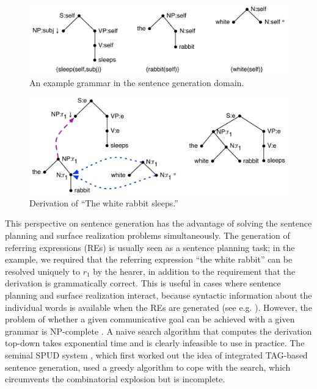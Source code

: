 \begin{figure}
  \centering
  \includegraphics[width=0.75\columnwidth]{pic-grammar}
  \caption{An example grammar in the sentence generation domain.}
  \label{fig:white-rabbit-sleeps-grammar}
\end{figure}

\begin{figure}
  \centering
  \includegraphics[width=0.75\columnwidth]{pic-derivation}
  \caption{Derivation of ``The white rabbit sleeps.''}
  \label{fig:white-rabbit-sleeps-deriv}
\end{figure}

This perspective on sentence generation has the advantage of solving
the sentence planning and surface realization problems
simultaneously. The generation of referring expressions (REs) is
usually seen as a sentence planning task; in the example, we required
that the referring expression ``the white rabbit'' can be resolved
uniquely to $r_1$ by the hearer, in addition to the requirement that
the derivation is grammatically correct. This is useful in cases where
sentence planning and surface realization interact, because syntactic
information about the individual words is available when the REs are
generated (see e.g. \citealt{stone98textual}). However, the problem of
whether a given communicative goal can be achieved with a given
grammar is NP-complete \citep{KolStr02}. A naive search algorithm that
computes the derivation top-down takes exponential time and is clearly
infeasible to use in practice. The seminal SPUD system
\citep{Stone2003a}, which first worked out the idea of integrated
TAG-based sentence generation, used a greedy algorithm to cope with
the search, which circumvents the combinatorial explosion but is
incomplete.

